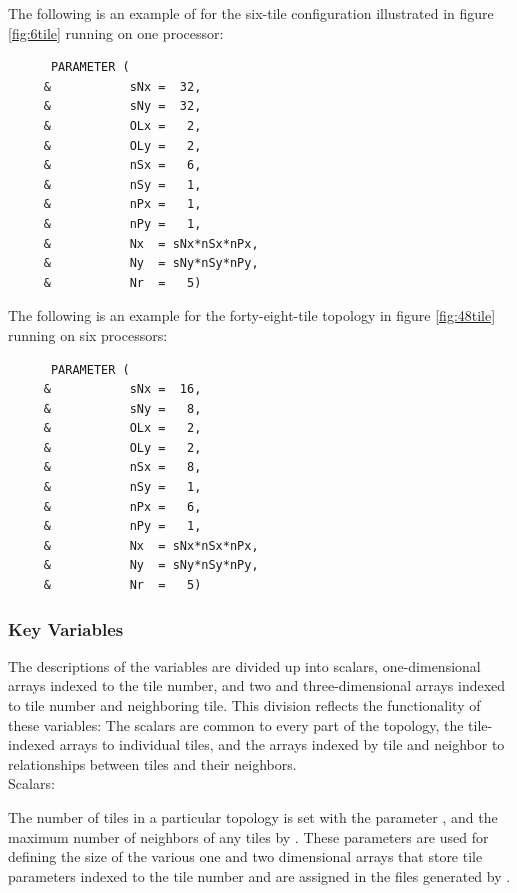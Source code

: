 The following is an example of  for the six-tile
configuration illustrated in figure \ref{fig:6tile} 
running on one processor:

\begin{verbatim}
      PARAMETER (
     &           sNx =  32,
     &           sNy =  32,
     &           OLx =   2,
     &           OLy =   2,
     &           nSx =   6,
     &           nSy =   1,
     &           nPx =   1,
     &           nPy =   1,
     &           Nx  = sNx*nSx*nPx,
     &           Ny  = sNy*nSy*nPy,
     &           Nr  =   5)
\end{verbatim}

The following is an example for the forty-eight-tile topology in
figure \ref{fig:48tile} running on six processors:

\begin{verbatim}
      PARAMETER (
     &           sNx =  16,
     &           sNy =   8,
     &           OLx =   2,
     &           OLy =   2,
     &           nSx =   8,
     &           nSy =   1,
     &           nPx =   6,
     &           nPy =   1,
     &           Nx  = sNx*nSx*nPx,
     &           Ny  = sNy*nSy*nPy,
     &           Nr  =   5)
\end{verbatim}


\subsubsection{Key Variables}

The descriptions of the variables are divided up into scalars,
one-dimensional arrays indexed to the tile number, and two and
three-dimensional arrays indexed to tile number and neighboring tile.
This division reflects the functionality of these variables: The
scalars are common to every part of the topology, the tile-indexed
arrays to individual tiles, and the arrays indexed by tile and
neighbor to relationships between tiles and their neighbors. \\

Scalars:

The number of tiles in a particular topology is set with the parameter
, and the maximum number of neighbors of any tiles by
.  These parameters are used for defining the
size of the various one and two dimensional arrays that store tile
parameters indexed to the tile number and are assigned in the files
generated by .\\

